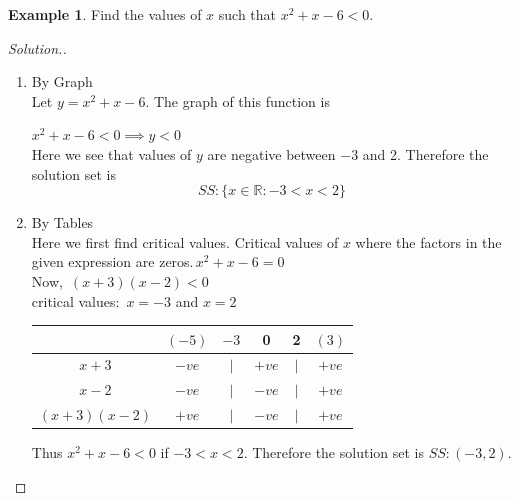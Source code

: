 \documentclass[11pt,a4paper]{article}
\theoremstyle{definition}
\newtheorem{example}[thm]{Example}
\newenvironment{solution}
  {\renewcommand{\qedsymbol}{}\begin{proof}[\textit{Solution}.]}
  {\end{proof}}
\begin{document}
\begin{example}

Find the values of $x$ such that $x^2+x-6<0$.
\end{example}
\begin{solution}

\begin{enumerate}
\item By Graph\\

Let $y=x^2+x-6$. The graph of this function is 


\begin{figure}[H]
\centering
{}
\end{figure}

$x^2+x-6<0\implies y<0$\\

Here we see that values of $y$ are negative between $-3$ and 2. Therefore the solution set is $$SS: \{x\in \mathbb{R}:-3<x<2\}$$

\item By Tables\\

Here we first find critical values. Critical values of $x$ where the factors in the given expression are zeros.\,$x^2+x-6=0$\\

Now, \,$(x+3)(x-2)<0$\\

critical values: \,$x=-3$ and $x=2$\\



\begin{table}[H]
\centering
\begin{tabular}{cccccc}
& $(-5)$ & $-3$  & 0 & 2& $(3)$\\
\hline
\multicolumn{1}{c|}{$x+3$ } & $-ve$ & $|$ & $+ve$ & $|$  & $+ve$\\
\multicolumn{1}{c|}{$x-2$} & $-ve$  & $|$ & $-ve$ & $|$  & $+ve$\\
\multicolumn{1}{c|}{$(x+3)(x-2)$} & $+ve$ & $|$ & $-ve$  & $|$ & $+ve$\\
\end{tabular}
\end{table}


Thus $x^2+x-6<0$ if $-3<x<2$. Therefore the solution set is $SS:(-3,2)$.\\
\end{enumerate}
\end{solution}
\end{document}
